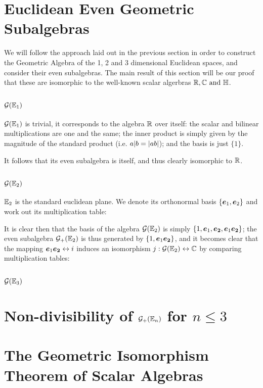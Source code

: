 \section{Euclidean Even Geometric Subalgebras}

We will follow the approach laid out in the previous section in order to construct the Geometric Algebra of the 1, 2 and 3 dimensional Euclidean spaces, and consider their even subalgebras.
The main result of this section will be our proof that these are isomorphic to the well-known scalar algerbras $\R, \C \mathrm{\ and\ } \HM$.

\subsection{$\mathcal{G}(\mathbb{E}_1)$}

$\mathcal{G}(\mathbb{E}_1)$  is trivial, it corresponds to the algebra $\mathbb{R}$ over itself: the scalar and bilinear multiplications are one and the same; the inner product is simply given by the magnitude of the standard product (i.e. $a | b = \left|ab\right|$); and the basis is just $\{1\}$.

It follows that its even subalgebra is itself, and thus clearly isomorphic to $\mathbb{R}$.

\subsection{$\mathcal{G}(\mathbb{E}_2)$}

$\mathbb{E}_2$ is the standard euclidean plane. We denote its orthonormal basis $\{\boldsymbol{e}_1, \boldsymbol{e}_2\}$ and work out its multiplication table:


It is clear then that the basis of the algebra $\mathcal{G}(\mathbb{E}_2)$ is simply $\{1, \boldsymbol{e}_1, \boldsymbol{e_2}, \boldsymbol{e}_1\boldsymbol{e_2}\}$; the even subalgebra $\mathcal{G}_+(\mathbb{E}_2)$ is thus generated by $\{1, \boldsymbol{e}_1\boldsymbol{e_2} \}$, and it becomes clear that the mapping $\boldsymbol{e}_1\boldsymbol{e_2} \leftrightarrow i$ induces an isomorphism $j : \mathcal{G}(\mathbb{E}_2) \leftrightarrow \mathbb{C}$ by comparing multiplication tables:


\subsection{$\mathcal{G}(\mathbb{E}_3)$}

\newpage

\section{Non-divisibility of $\mathcal{G}_+(\mathbb{E}_n)$ for $n \leq 3$}

\newpage

\section{The Geometric Isomorphism Theorem of Scalar Algebras}

